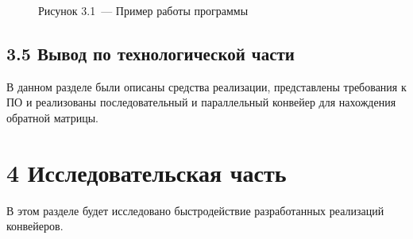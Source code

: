 \documentclass[12pt, a4paper]{report}
\begin{document}
	\begin{figure}[H]
		\caption*{Рисунок 3.1~--- Пример работы программы}
	\end{figure}
	
	\section*{3.5 Вывод по технологической части}
	
	В данном разделе были описаны средства реализации, представлены требования к ПО и реализованы последовательный и параллельный конвейер для нахождения обратной матрицы.
	
	\chapter*{4 Исследовательская часть}
	
	В этом разделе будет исследовано быстродействие разработанных реализаций конвейеров.
	
\end{document}
